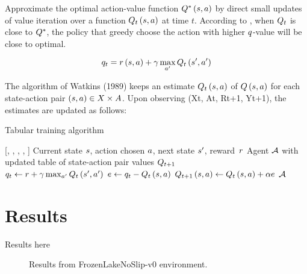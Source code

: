 \documentclass[conference]{IEEEtran}
\begin{document}
Approximate the optimal action-value function $\Qfoptimal$ by direct small updates of value iteration over a function $\Qftarget$ at time $t$.
According to \cite{Szepesvari:2010}, when $\Qtarget$ is close to $\Qoptimal$, the policy that greedy choose the action with higher $\q$-value will be close to optimal.

\begin{equation}
\qtarget = \rewardf + \discountfactor \max_{\nextaction}{\nextQftarget}
\label{qtarget}
\end{equation}


The {\QLearning} algorithm of Watkins (1989) keeps an estimate $\Qftarget$ of $\Qf$ for each state-action pair $\Qargs \in X \times A$. Upon observing (Xt, At, Rt+1, Yt+1), the estimates are updated as follows:

\begin{algorithm}[ht]
    \caption{Tabular {\Qlearning} training algorithm}
    \begin{algorithmic}[1]
        [\agent, \state, \action, \nextstate, \reward]
        \INPUT      Current state $s$, action chosen $a$, next state $s^{\prime}$, \mbox{reward $r$}
        \OUTPUT     Agent $\mathcal{A}$ with updated table of state-action pair values $\nextQtarget$
        \\
        \STATE $ \qtarget \gets \reward + \discountfactor \max_{\nextaction}{\nextQftarget} $
        \STATE $ \error \gets \qtarget - \Qftarget $
        \STATE $ \nextQtarget\Qargs \gets \Qftarget + \learningrate \error $
        \RETURN $\mathcal{A}$
    \end{algorithmic}
    \label{qlearning}
\end{algorithm}


\section{Results}

Results here

\begin{figure*}[!t]
    \centering
    
    \caption{Results from FrozenLakeNoSlip-v0 environment.}
    \label{results_FrozenLakeNoSlip-v0}
\end{figure*}
\end{document}
